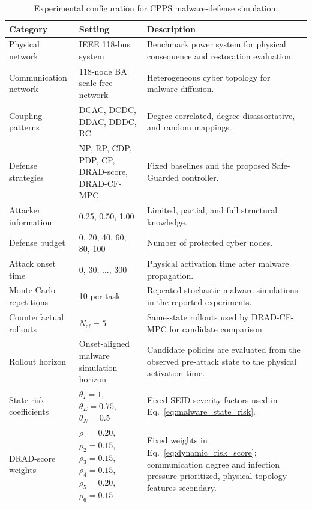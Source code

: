 \documentclass[lettersize,journal]{IEEEtran}
\begin{document}
\begin{table}[!t]
\centering
\caption{Experimental configuration for CPPS malware-defense simulation.}
\label{tab:experimental_configuration}
\small
\begin{tabular}{p{} p{} p{}}
\toprule
\rowcolor{TableHeader}
Category & Setting & Description \\
\midrule
\rowcolor{RowScenario}
Physical network & IEEE 118-bus system & Benchmark power system for physical consequence and restoration evaluation. \\
\rowcolor{RowBaseline}
Communication network & 118-node BA scale-free network & Heterogeneous cyber topology for malware diffusion. \\
\rowcolor{RowScenario}
Coupling patterns & DCAC, DCDC, DDAC, DDDC, RC & Degree-correlated, degree-disassortative, and random mappings. \\
\rowcolor{RowProposed}
Defense strategies & NP, RP, CDP, PDP, CP, DRAD-score, DRAD-CF-MPC & Fixed baselines and the proposed Safe-Guarded controller. \\
\rowcolor{RowRisk}
Attacker information & 0.25, 0.50, 1.00 & Limited, partial, and full structural knowledge. \\
\rowcolor{RowBudget}
Defense budget & 0, 20, 40, 60, 80, 100 & Number of protected cyber nodes. \\
\rowcolor{RowPhysical}
Attack onset time & 0, 30, $\ldots$, 300 & Physical activation time after malware propagation. \\
\rowcolor{RowScenario}
Monte Carlo repetitions & 10 per task & Repeated stochastic malware simulations in the reported experiments. \\
\rowcolor{RowBaseline}
Counterfactual rollouts & $N_{\mathrm{cf}}=5$ & Same-state rollouts used by DRAD-CF-MPC for candidate comparison. \\
\rowcolor{RowScenario}
Rollout horizon & Onset-aligned malware simulation horizon & Candidate policies are evaluated from the observed pre-attack state to the physical activation time. \\
\rowcolor{RowRisk}
State-risk coefficients & $\theta_I=1$, $\theta_E=0.75$, $\theta_N=0.5$ & Fixed SEID severity factors used in Eq.~\eqref{eq:malware_state_risk}. \\
\rowcolor{RowBudget}
DRAD-score weights & $\rho_1{=}0.20$, $\rho_2{=}0.15$, $\rho_3{=}0.15$, $\rho_4{=}0.15$, $\rho_5{=}0.20$, $\rho_6{=}0.15$ & Fixed weights in Eq.~\eqref{eq:dynamic_risk_score}; communication degree and infection pressure prioritized, physical topology features secondary. \\

\end{tabular}
\end{table}
\end{document}
